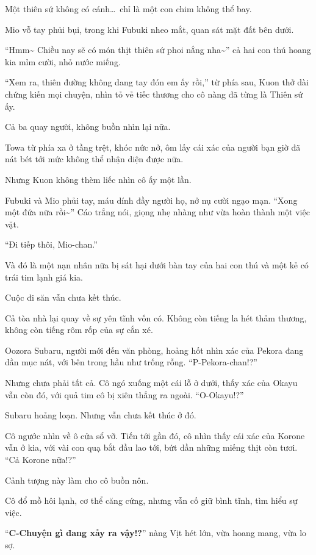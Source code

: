 \documentclass[../main.tex]{subfiles}
\begin{document}
Một thiên sứ không có cánh\dots\ chỉ là một con chim không thể bay.

Mio vỗ tay phủi bụi, trong khi Fubuki nheo mắt, quan sát mặt đất bên dưới.

``Hmm\~{} Chiều nay sẽ có món thịt thiên sứ phoi nắng nha\~{}'' cả hai con thú hoang kia mỉm cười, nhỏ nước miếng.

``Xem ra, thiên đường không dang tay đón em ấy rồi,'' từ phía sau, Kuon thở dài chứng kiến mọi chuyện, nhìn tỏ vẻ tiếc thương cho cô nàng đã từng là Thiên sứ ấy.

Cả ba quay người, không buồn nhìn lại nữa.

Towa từ phía xa ở tầng trệt, khóc nức nở, ôm lấy cái xác của người bạn giờ đã nát bét tới mức không thể nhận diện được nữa.

Nhưng Kuon không thèm liếc nhìn cô ấy một lần.

Fubuki và Mio phủi tay, máu dính đầy người họ, nở nụ cười ngạo mạn. ``Xong một đứa nữa rồi\~{}'' Cáo trắng nói, giọng nhẹ nhàng như vừa hoàn thành một việc vặt.

``Đi tiếp thôi, Mio-chan.''

Và đó là một nạn nhân nữa bị sát hại dưới bàn tay của hai con thú và một kẻ có trái tim lạnh giá kia.

Cuộc đi săn vẫn chưa kết thúc.

\il

Cả tòa nhà lại quay về sự yên tĩnh vốn có. Không còn tiếng la hét thảm thương, không còn tiếng rôm rốp của sự cắn xé.

Oozora Subaru, người mới đến văn phòng, hoảng hốt nhìn xác của Pekora đang dần mục nát, với bên trong hầu như trống rỗng. ``P-Pekora-chan!?''

Nhưng chưa phải tất cả. Cô ngó xuống một cái lỗ ở dưới, thấy xác của Okayu vẫn còn đó, với quả tim cô bị xiên thẳng ra ngoài. ``O-Okayu!?''

Subaru hoảng loạn. Nhưng vẫn chưa kết thúc ở đó.

Cô ngước nhìn về ô cửa sổ vỡ. Tiến tới gần đó, cô nhìn thấy cái xác của Korone vẫn ở kia, với vài con quạ bắt đầu lao tới, bứt dần những miếng thịt còn tươi. ``Cả Korone nữa!?''

Cảnh tượng này làm cho cô buồn nôn.

Cô đổ mồ hôi lạnh, cơ thể căng cứng, nhưng vẫn cố giữ bình tĩnh, tìm hiểu sự việc.

``\textbf{C-Chuyện gì đang xảy ra vậy!?}'' nàng Vịt hét lớn, vừa hoang mang, vừa lo sợ.
\end{document}
